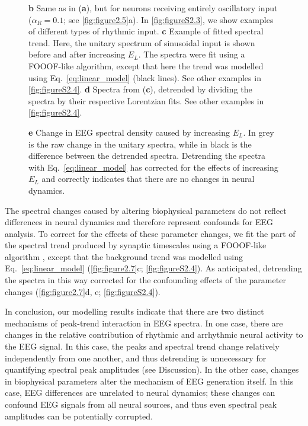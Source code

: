 \begin{figure}
\begin{minipage}[c]{70mm}
{	\textbf{b} Same as in (\textbf{a}), but for neurons receiving entirely oscillatory input ($\alpha_R=0.1$; see \autoref{fig:figure2.5}a). In \autoref{fig:figureS2.3}, we show examples of different types of rhythmic input.
	\textbf{c} Example of fitted spectral trend. Here, the unitary spectrum of sinusoidal input is shown before and after increasing $E_L$. The spectra were fit using a FOOOF-like algorithm\cite{Donoghue2020}, except that here the trend was modelled using Eq.~\ref{eq:linear_model} (black lines). See other examples in \autoref{fig:figureS2.4}.
        \textbf{d} Spectra from (\textbf{c}), detrended by dividing the spectra by their respective Lorentzian fits. See other examples in \autoref{fig:figureS2.4}. 
    } \label{fig:figure2.7}
  \end{minipage}
  \begin{minipage}[c]{\textwidth}
    \vspace*{-0.72cm} \footnotesize \singlespacing
	\textbf{e} Change in EEG spectral density caused by increasing $E_L$. In grey is the raw change in the unitary spectra, while in black is the difference between the detrended spectra. Detrending the spectra with Eq.~\ref{eq:linear_model} has corrected for the effects of increasing $E_L$ and correctly indicates that there are no changes in neural dynamics. 
  \end{minipage}
\end{figure}

The spectral changes caused by altering biophysical parameters do not reflect differences in neural dynamics and therefore represent confounds for EEG analysis. To correct for the effects of these parameter changes, we fit the part of the spectral trend produced by synaptic timescales using a FOOOF-like algorithm \cite{Donoghue2020}, except that the background trend was modelled using Eq.~\ref{eq:linear_model} (\autoref{fig:figure2.7}c; \autoref{fig:figureS2.4}). As anticipated, detrending the spectra in this way corrected for the confounding effects of the parameter changes (\autoref{fig:figure2.7}d, e; \autoref{fig:figureS2.4}).

In conclusion, our modelling results indicate that there are two distinct mechanisms of peak-trend interaction in EEG spectra. In one case, there are changes in the relative contribution of rhythmic and arrhythmic neural activity to the EEG signal. In this case, the peaks and spectral trend change relatively independently from one another, and thus detrending is unnecessary for quantifying spectral peak amplitudes (see Discussion). In the other case, changes in biophysical parameters alter the mechanism of EEG generation itself. In this case, EEG differences are unrelated to neural dynamics; these changes can confound EEG signals from all neural sources, and thus even spectral peak amplitudes can be potentially corrupted.

